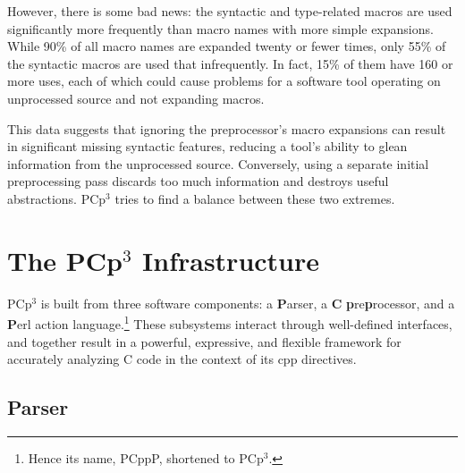 \documentclass{article}
\newcommand{\pcp}{\mbox{\textsf{PCp}$^3$}}
\newcommand{\pcppp}{\mbox{\textsf{PCppP}}}
\newcommand{\Cpp}{\mbox{\textsf{cpp}}}
\newcommand{\C}{\mbox{C}}
\newcommand{\ppd}[1]{\texttt{\##1}}
\begin{document}
However, there is some bad news: the syntactic and type-related macros
are used significantly more frequently than macro names with more simple
expansions.  While 90\% of all macro names are expanded twenty or fewer
times, only 55\% of the syntactic macros are used that infrequently.  In
fact, 15\% of them have 160 or more uses, each of which could cause
problems for a software tool operating on unprocessed source and not
expanding macros.

This data suggests that ignoring the preprocessor's macro expansions can
result in significant missing syntactic features, reducing a tool's
ability to glean information from the unprocessed source.  Conversely,
using a separate initial preprocessing pass discards too much
information and destroys useful abstractions.  \pcp{} tries to find a balance
between these two extremes.




\section{The \pcp{} Infrastructure}
\label{sec:pcp3}
\pcp{} is built from three software components: a \textbf{\textsf{P}}arser, a \textbf{\textsf{C}}
\textbf{\textsf{p}}re\textbf{\textsf{p}}rocessor, and a \textbf{\textsf{P}}erl action
language.\footnote{Hence its name, \pcppp{}, shortened to \pcp{}.}
These subsystems interact through well-defined interfaces, and together
result in a powerful, expressive, and flexible framework for accurately
analyzing \C{} code in the context of its \Cpp{} directives.

\subsection{Parser}
\end{document}
